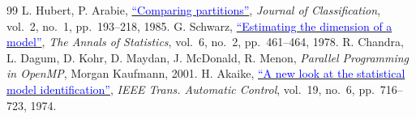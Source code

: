 \documentclass[conference,onecolumn]{IEEEtran}
\begin{document}
\begin{thebibliography}{99}
 L. Hubert, P. Arabie, \href{https://doi.org/10.1007/BF01908075}{\textcolor{blue}{``Comparing partitions''}}, \emph{Journal of Classification}, vol.~2, no.~1, pp.~193--218, 1985.
 G. Schwarz, \href{https://doi.org/10.1214/aos/1176344136}{\textcolor{blue}{``Estimating the dimension of a model''}}, \emph{The Annals of Statistics}, vol.~6, no.~2, pp.~461--464, 1978.
 R. Chandra, L. Dagum, D. Kohr, D. Maydan, J. McDonald, R. Menon, \emph{Parallel Programming in OpenMP}, Morgan Kaufmann, 2001.
 H. Akaike, \href{https://doi.org/10.1109/TAC.1974.1100705}{\textcolor{blue}{``A new look at the statistical model identification''}}, \emph{IEEE Trans. Automatic Control}, vol.~19, no.~6, pp.~716--723, 1974.
\end{thebibliography}
\end{document}
